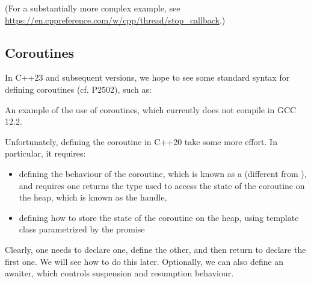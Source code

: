 (For a substantially more complex example, see \url{https://en.cppreference.com/w/cpp/thread/stop_callback}.)



\subsection{Coroutines}

In C++23 and subsequent versions, we hope to see some standard syntax for defining coroutines (cf. P2502), such as:

\raggedbottom
\begin{codebox}[]{}
\footnotesize An example of the use of coroutines, which currently does not compile in GCC 12.2.
\tcblower
{}
\end{codebox}

Unfortunately, defining the coroutine in C++20 take some more effort. In particular, it requires:
\begin{itemize}
\item defining the behaviour of the coroutine, which is known as a  (different from ), and requires one returns the type used to access the state of the coroutine on the heap, which is known as the handle,  
\item defining how to store the state of the coroutine on the heap, using template class  parametrized by the promise
\end{itemize}
Clearly, one needs to declare one, define the other, and then return to declare the first one. We will see how to do this later.
Optionally, we can also define an awaiter, which controls suspension and resumption behaviour.

